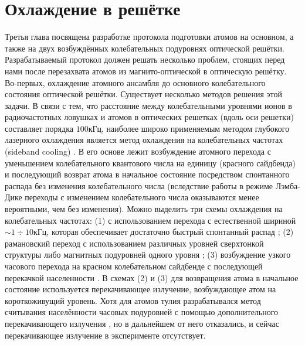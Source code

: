 \chapter{Охлаждение в решётке}\label{ch:ch3}

Третья глава посвящена разработке протокола подготовки атомов на основном, а также на двух возбуждённых колебательных подуровнях оптической решётки.
Разрабатываемый протокол должен решать несколько проблем, стоящих перед нами после перезахвата атомов из магнито-оптической в оптическую решётку.
Во-первых, охлаждение атомного ансамбля до основного колебательного состояния оптической решётки. 
Существует несколько методов решения этой задачи.
В связи с тем, что расстояние между колебательными уровнями ионов в радиочастотных ловушках и атомов в оптических решетках (вдоль оси решетки) составляет порядка $100\unit{кГц}$, наиболее широко применяемым методом глубокого лазерного охлаждения является метод охлаждения на колебательных частотах (sideband cooling) \cite{neuhauser1978optical, perrin1998sideband}. 
В его основе лежит возбуждение атомного перехода с уменьшением колебательного квантового числа на единицу (красного сайдбенда) и последующий возврат атома в начальное состояние посредством спонтанного распада без изменения колебательного числа (вследствие работы в режиме Лэмба-Дике переходы с изменением колебательного числа оказываются менее  вероятными, чем без изменения). 
Можно выделить три схемы охлаждения на колебательных частотах: (1) с использованием перехода с естественной шириной $\sim 1\div10\unit{кГц}$, которая обеспечивает достаточно быстрый спонтанный распад \cite{ushijima2018operational};%
(2) рамановский переход с использованием различных уровней сверхтонкой структуры либо магнитных подуровней одного уровня \cite{chen2017sympathetic, seck2016raman}; 
(3) возбуждение узкого часового перехода на красном колебательном сайдбенде с последующей перекачкой населенности \cite{zhang2022subrecoil}. 
В схемах (2) и (3) для возвращения атома в начальное состояние используется перекачивающее излучение, возбуждающее атом на короткоживущий уровень.
Хотя для атомов тулия разрабатывался метод считывания населённости часовых подуровней с помощью дополнительного перекачивающего излучения \cite{tregubov2020detection}, но в дальнейшем от него отказались, и сейчас перекачивающее излучение в эксперименте отсутствует. 

